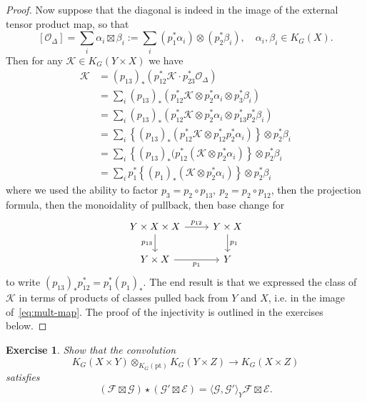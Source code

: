 \documentclass[11pt]{amsart}
\newtheorem{exercise}[dummy]{Exercise}
\theoremstyle{definition}
\newcommand{\Oc}{\mathcal{O}}
\numberwithin{equation}{subsection}
\numberwithin{figure}{subsection}
\newcommand{\pt}{\mathrm{pt}}
\begin{document}
\begin{proof}
 Now suppose that the diagonal is indeed in the image of the external tensor product map, so that 
$$
[\Oc_\Delta] = \sum_i \alpha_i\boxtimes \beta_i := \sum_i (p_1^*\alpha_i)\otimes (p_2^*\beta_i),\quad \alpha_i,\beta_i\in K_G(X).
$$
Then for any $\mathcal{K}\in K_G(Y\times X)$ we have
\begin{align*}
\mathcal{K} &= (p_{13})_*\left(p_{12}^*\mathcal{K} \cdot p_{23}^*\Oc_\Delta\right)\\
&=\sum_i (p_{13})_*\left(p_{12}^*\mathcal{K}\otimes p_{2}^*\alpha_i\otimes p_{3}^*\beta_i\right)\\
&=\sum_i (p_{13})_*\left(p_{12}^*\mathcal{K}\otimes p_{2}^*\alpha_i\otimes p_{13}^*p_2^*\beta_i\right)\\
&=\sum_i \left\{(p_{13})_*(p_{12}^*\mathcal{K}\otimes p_{12}^*p_{2}^*\alpha_i)\right\}\otimes p_2^*\beta_i\\
&=\sum_i \left\{(p_{13})_*(p_{12}^*(\mathcal{K}\otimes p_{2}^*\alpha_i)\right\}\otimes p_2^*\beta_i\\
&=\sum_i p_1^*\left\{(p_1)_*(\mathcal{K}\otimes p_{2}^*\alpha_i)\right\}\otimes p_2^*\beta_i
\end{align*}
where we used the ability to factor $p_3 = p_2\circ p_{13}, ~p_2 = p_2\circ p_{12}$, then  the projection formula, then the monoidality of pullback, then base change for
$$
\begin{tikzcd}
Y\times X\times X \arrow{r}{p_{12}} \arrow[swap]{d}{p_{13}}& Y\times X \arrow{d}{p_1} \\
Y\times X \arrow[swap]{r}{p_{1}} & Y
\end{tikzcd}
$$
to write $(p_{13})_*p_{12}^* =p_1^*(p_1)_*$. The end result is that we expressed the class of $\mathcal{K}$ in terms of products of classes pulled back from $Y$ and $X$, i.e. in the image of~\eqref{eq:mult-map}. The proof of the injectivity is outlined in the exercises below.
\end{proof}

\begin{exercise}
\label{eq:conv-formula}
Show that the convolution
$$
K_G(X\times Y)\otimes_{K_G(\pt)} K_G(Y\times Z)\rightarrow K_G(X\times Z)
$$
satisfies
$$
(\mathcal{F}\boxtimes\mathcal{G})\star(\mathcal{G}'\boxtimes\mathcal{E}) = \langle \mathcal{G},\mathcal{G}'\rangle_Y \mathcal{F}\boxtimes \mathcal{E}.
$$
\end{exercise}
\end{document}
